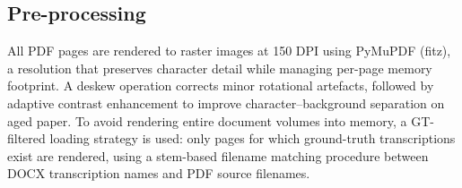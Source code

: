 \documentclass[11pt,a4paper]{article}
\begin{document}
\subsection*{Pre-processing}

All PDF pages are rendered to raster images at 150 DPI using PyMuPDF (fitz), a resolution
that preserves character detail while managing per-page memory footprint. A deskew operation
corrects minor rotational artefacts, followed by adaptive contrast enhancement to improve
character--background separation on aged paper. To avoid rendering entire document volumes
into memory, a GT-filtered loading strategy is used: only pages for which ground-truth
transcriptions exist are rendered, using a stem-based filename matching procedure between
DOCX transcription names and PDF source filenames.

\end{document}
